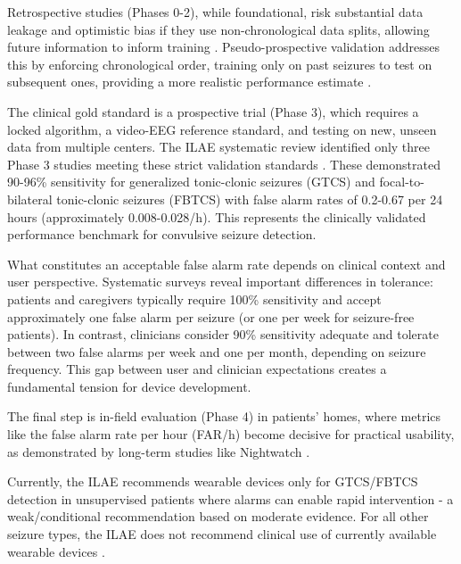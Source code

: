 Retrospective studies (Phases 0-2), while foundational,
risk substantial data leakage and optimistic bias if they use non-chronological data splits,
allowing future information to inform training
\parencite{kalousiosECGbasedEpilepticSeizure2024, wongEEGDatasetsSeizure2023}.
Pseudo-prospective validation addresses this by enforcing chronological order,
training only on past seizures to test on subsequent ones,
providing a more realistic performance estimate
\parencite{kalousiosECGbasedEpilepticSeizure2024, luLeveragingChannelCoherence2025}.

The clinical gold standard is a prospective trial (Phase 3),
which requires a locked algorithm, a video-EEG reference standard,
and testing on new, unseen data from multiple centers.
The ILAE systematic review identified only three Phase 3 studies meeting these strict validation standards
\parencite{beniczkyAutomatedSeizureDetection2021}.
These demonstrated 90-96\% sensitivity for generalized tonic-clonic seizures (GTCS) and focal-to-bilateral tonic-clonic seizures (FBTCS) with false alarm rates of 0.2-0.67 per 24 hours (approximately 0.008-0.028/h). This represents the clinically validated performance benchmark for convulsive seizure detection.

What constitutes an acceptable false alarm rate depends on clinical context and user perspective. Systematic surveys reveal important differences in tolerance: patients and caregivers typically require 100\% sensitivity and accept approximately one false alarm per seizure (or one per week for seizure-free patients). In contrast, clinicians consider 90\% sensitivity adequate and tolerate between two false alarms per week and one per month, depending on seizure frequency. This gap between user and clinician expectations creates a fundamental tension for device development.

The final step is in-field evaluation (Phase 4) in patients' homes,
where metrics like the false alarm rate per hour (FAR/h) become decisive for practical usability,
as demonstrated by long-term studies like Nightwatch
\parencite{mironAutonomicBiosignalsSeizure2025, shumCommerciallyAvailableSeizure2021}.

Currently, the ILAE recommends wearable devices only for GTCS/FBTCS detection in unsupervised patients where alarms can enable rapid intervention - a weak/conditional recommendation based on moderate evidence. For all other seizure types, the ILAE does not recommend clinical use of currently available wearable devices
\parencite{beniczkyAutomatedSeizureDetection2021}.